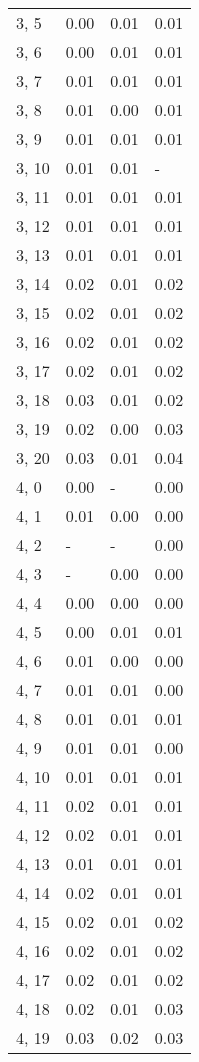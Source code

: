 \begin{table}
\begin{tabular}{llll}
3, 5   &  0.00 &  0.01 &  0.01 \\
3, 6   &  0.00 &  0.01 &  0.01 \\
3, 7   &  0.01 &  0.01 &  0.01 \\
3, 8   &  0.01 &  0.00 &  0.01 \\
3, 9   &  0.01 &  0.01 &  0.01 \\
3, 10  &  0.01 &  0.01 &     - \\
3, 11  &  0.01 &  0.01 &  0.01 \\
3, 12  &  0.01 &  0.01 &  0.01 \\
3, 13  &  0.01 &  0.01 &  0.01 \\
3, 14  &  0.02 &  0.01 &  0.02 \\
3, 15  &  0.02 &  0.01 &  0.02 \\
3, 16  &  0.02 &  0.01 &  0.02 \\
3, 17  &  0.02 &  0.01 &  0.02 \\
3, 18  &  0.03 &  0.01 &  0.02 \\
3, 19  &  0.02 &  0.00 &  0.03 \\
3, 20  &  0.03 &  0.01 &  0.04 \\
4, 0   &  0.00 &     - &  0.00 \\
4, 1   &  0.01 &  0.00 &  0.00 \\
4, 2   &     - &     - &  0.00 \\
4, 3   &     - &  0.00 &  0.00 \\
4, 4   &  0.00 &  0.00 &  0.00 \\
4, 5   &  0.00 &  0.01 &  0.01 \\
4, 6   &  0.01 &  0.00 &  0.00 \\
4, 7   &  0.01 &  0.01 &  0.00 \\
4, 8   &  0.01 &  0.01 &  0.01 \\
4, 9   &  0.01 &  0.01 &  0.00 \\
4, 10  &  0.01 &  0.01 &  0.01 \\
4, 11  &  0.02 &  0.01 &  0.01 \\
4, 12  &  0.02 &  0.01 &  0.01 \\
4, 13  &  0.01 &  0.01 &  0.01 \\
4, 14  &  0.02 &  0.01 &  0.01 \\
4, 15  &  0.02 &  0.01 &  0.02 \\
4, 16  &  0.02 &  0.01 &  0.02 \\
4, 17  &  0.02 &  0.01 &  0.02 \\
4, 18  &  0.02 &  0.01 &  0.03 \\
4, 19  &  0.03 &  0.02 &  0.03 \\

\end{tabular}
\end{table}

